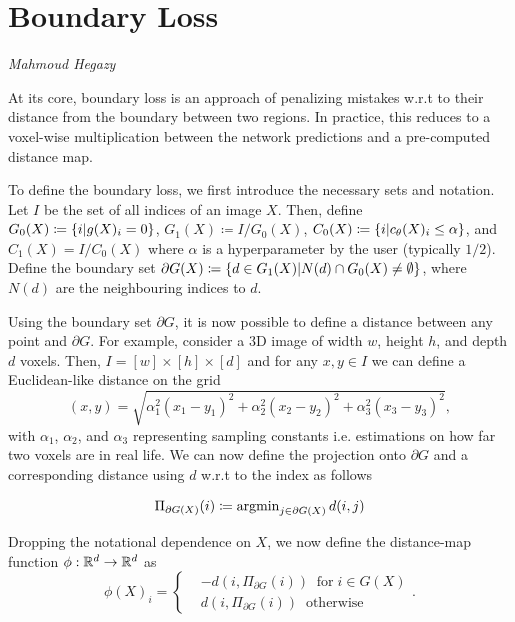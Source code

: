\documentclass[onecolumn]{article}
\begin{document}
\section{Boundary Loss} 
\textit{Mahmoud Hegazy} 


At its core, boundary loss is an approach of penalizing mistakes w.r.t to their distance from the boundary between two regions. In practice, this reduces to a voxel-wise multiplication between the network predictions and a pre-computed distance map.

To define the boundary loss, we first introduce the necessary sets and notation. Let $I$ be the set of all indices of an image $X$. Then, define $G_0(X) \coloneqq \left \{ i | g(X)_i = 0 \right \}$, $G_1(X)\coloneqq I / G_0(X)$, $C_0(X) \coloneqq \left \{ i| c_\theta(X)_i\leq\alpha \right \}$, and $C_1(X) = I/C_0(X)$ where $\alpha$ is a hyperparameter by the user (typically $1/2$). Define the boundary set $\partial G(X) \coloneqq \left \{ d \in G_1(X) | N(d)\cap G_0(X)\neq \emptyset \right \}$, where $N(d)$ are the neighbouring indices to $d$. 

Using the boundary set $\partial G$, it is now possible to define a distance between any point and $\partial G$. For example, consider a 3D image of width $w$, height $h$, and depth $d$ voxels. Then, $I = [w]\times [h]\times [d]$ and for any $x, y\in I$ we can define a Euclidean-like distance on the grid 
\begin{equation}
    (x,y) = \sqrt{\alpha_1^2(x_1-y_1)^2+\alpha_2^2(x_2-y_2)^2+\alpha_3^2(x_3-y_3)^2},
\end{equation}
with $\alpha_1$, $\alpha_2$, and $\alpha_3$ representing sampling constants i.e. estimations on how far two voxels are in real life. We can now define the projection onto $\partial G$ and a corresponding distance using $d$ w.r.t to the index as follows

\begin{gather}
    \Pi_{\partial G(X)}(i) \coloneqq \operatorname{argmin}_{j \in \partial G(X)} d(i,j)
\end{gather}

Dropping the notational dependence on $X$, we now define the distance-map function $\phi:\mathbb{R}^d\rightarrow \mathbb{R}^d$ as 
\begin{equation}
\label{eq:boundary_distance}
\phi(X)_i=
\begin{cases}
& -d(i,\Pi_{\partial G}(i) )\;\;  \text{for} \; i \in G(X) \\
& d(i,\Pi_{\partial G}(i) ) \;\;\text{otherwise}
\end{cases} .\text{}
\end{equation}
\end{document}
